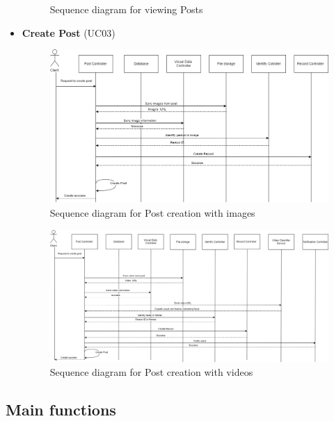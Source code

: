 \begin{itemize}
\begin{center}
\begin{figure}[H]
		\caption{Sequence diagram for viewing Posts}
		\end{figure}
	\end{center}
	\item \textbf{Create Post} (UC03)
	\begin{center}
		\begin{figure}[H]
		\centering
		\includegraphics[width=1\columnwidth]{images/chap4/createpost_sequence.png}
		\caption{Sequence diagram for Post creation with images}
		\end{figure}
	\end{center}
	\begin{center}
		\begin{figure}[H]
		\centering
		\includegraphics[width=1\columnwidth]{images/chap4/createpost_sequence_video.png}
		\caption{Sequence diagram for Post creation with videos}
		\end{figure}
	\end{center}

\end{itemize}

\subsection{Main functions}
